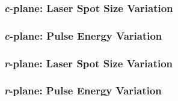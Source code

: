         \subsubsection{\textit{c}-plane: Laser Spot Size Variation}
            
        \subsubsection{\textit{c}-plane: Pulse Energy Variation}
            
        \subsubsection{\textit{r}-plane: Laser Spot Size Variation}
            
        \subsubsection{\textit{r}-plane: Pulse Energy Variation}
            